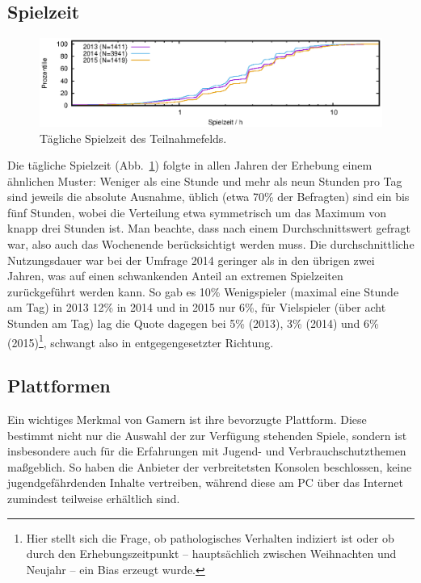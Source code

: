 \documentclass[11pt]{scrartcl}
\begin{document}
\subsection{Spielzeit}

\begin{figure}[htb]
	\centering
	\includegraphics[width=15cm]{vgl/spielzeit}
	\caption[Spielzeit]
	{Tägliche Spielzeit des Teilnahmefelds.}
	\label{fig: spielzeit}
\end{figure}

Die tägliche Spielzeit (Abb.~\ref{fig: spielzeit})
folgte in allen Jahren der Erhebung einem ähnlichen Muster:
Weniger als eine Stunde und mehr als neun Stunden pro Tag
sind jeweils die absolute Ausnahme,
üblich (etwa 70\% der Befragten) sind ein bis fünf Stunden,
wobei die Verteilung etwa symmetrisch um das Maximum von knapp drei
Stunden ist.
Man beachte, dass nach einem Durchschnittswert gefragt war,
also auch das Wochenende berücksichtigt werden muss.
Die durchschnittliche Nutzungsdauer war bei der Umfrage 2014 geringer
als in den übrigen zwei Jahren,
was auf einen schwankenden Anteil an extremen Spielzeiten
zurückgeführt werden kann.
So gab es 10\% Wenigspieler (maximal eine Stunde am Tag) in 2013
12\% in 2014 und in 2015 nur 6\%,
für Vielspieler (über acht Stunden am Tag) lag die Quote dagegen bei
5\% (2013), 3\% (2014) und 6\% (2015)\footnote{Hier stellt sich die Frage,
ob pathologisches Verhalten indiziert ist oder ob durch den Erhebungszeitpunkt
-- hauptsächlich zwischen Weihnachten und Neujahr -- ein Bias erzeugt wurde.},
schwangt also in entgegengesetzter Richtung.



\subsection{Plattformen}

Ein wichtiges Merkmal von Gamern ist ihre bevorzugte Plattform.
Diese bestimmt nicht nur die Auswahl der zur Verfügung stehenden Spiele,
sondern ist insbesondere auch für die Erfahrungen mit Jugend- und
Verbrauchschutzthemen maßgeblich.
So haben die Anbieter der verbreitetsten Konsolen beschlossen,
keine jugendgefährdenden Inhalte vertreiben,
während diese am PC über das Internet zumindest teilweise erhältlich sind.
\end{document}
